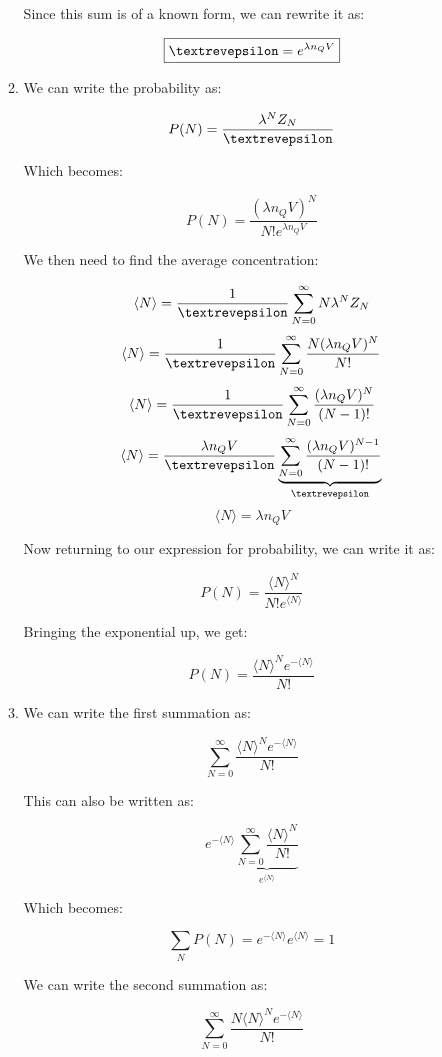 \begin{enumerate}
\begin{enumerate}
        Since this sum is of a known form, we can rewrite it as:

        $$\boxed{\text{\textrevepsilon}=e^{\lambda n_Q V}}$$

      \item 

        We can write the probability as:

        $$P(N)=\frac{\lambda^NZ_N}{\text{\textrevepsilon}}$$

        Which becomes:

        $$P(N)=\frac{(\lambda n_QV)^N}{N!e^{\lambda n_QV}}$$

        We then need to find the average concentration:

        $$\langle N\rangle=\frac{1}{\textrevepsilon}\sum_{N=0}^\infty N\lambda ^NZ_N$$
        $$\langle N\rangle=\frac{1}{\textrevepsilon}\sum_{N=0}^\infty \frac{N(\lambda n_QV)^N}{N!}$$
        $$\langle N\rangle=\frac{1}{\textrevepsilon}\sum_{N=0}^\infty \frac{(\lambda n_QV)^N}{(N-1)!}$$
        $$\langle N\rangle=\frac{\lambda n_Q V}{\textrevepsilon}\underbrace{\sum_{N=0}^\infty \frac{(\lambda n_QV)^{N-1}}{(N-1)!}}_{\text{\textrevepsilon}}$$
        $$\langle N\rangle=\lambda n_Q V$$

        Now returning to our expression for probability, we can write it as:

        $$P(N)=\frac{\langle N\rangle^N}{N!e^{\langle N\rangle}}$$

        Bringing the exponential up, we get:

        $$\boxed{P(N)=\frac{\langle N\rangle^Ne^{-\langle N\rangle}}{N!}}$$

      \item 

        We can write the first summation as:

        $$\sum_{N=0}^\infty\frac{\langle N\rangle^Ne^{-\langle N\rangle}}{N!}$$

        This can also be written as:

        $$e^{-\langle N\rangle}\underbrace{\sum_{N=0}^\infty\frac{\langle N\rangle^N}{N!}}_{e^{\langle N\rangle}}$$

        Which becomes:

        $$\boxed{\sum_N P(N)=e^{-\langle N\rangle}e^{\langle N\rangle}=1}$$

        We can write the second summation as:

        $$\sum_{N=0}^\infty\frac{N\langle N\rangle^Ne^{-\langle N\rangle}}{N!}$$


\end{enumerate}
\end{enumerate}
